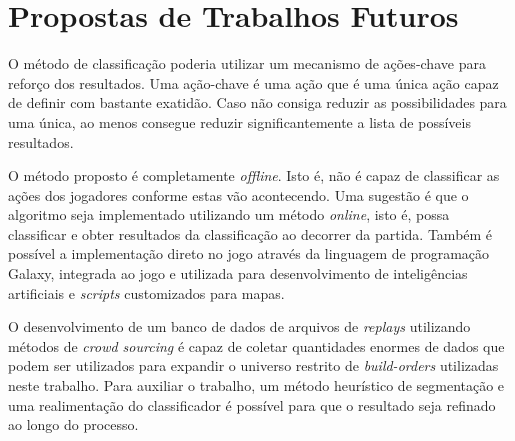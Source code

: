 	\chapter{Propostas de Trabalhos Futuros}
O método de classificação poderia utilizar um mecanismo de ações-chave para reforço dos resultados. Uma ação-chave é uma ação que é uma única ação capaz de definir com bastante exatidão. Caso não consiga reduzir as possibilidades para uma única, ao menos consegue reduzir significantemente a lista de possíveis resultados.

O método proposto é completamente \textit{offline}. Isto é, não é capaz de classificar as ações dos jogadores conforme estas vão acontecendo. Uma sugestão é que o algoritmo seja implementado utilizando um método \textit{online}, isto é, possa classificar e obter resultados da classificação ao decorrer da partida. Também é possível a implementação direto no jogo através da linguagem de programação Galaxy, integrada ao jogo e utilizada para desenvolvimento de inteligências artificiais e \textit{scripts} customizados para mapas.

O desenvolvimento de um banco de dados de arquivos de \textit{\glspl{replay}} utilizando métodos de \textit{crowd sourcing} é capaz de coletar quantidades enormes de dados que podem ser utilizados para expandir o universo restrito de \textit{\glspl{build-order}} utilizadas neste trabalho. Para auxiliar o trabalho, um método heurístico de segmentação e uma realimentação do classificador é possível para que o resultado seja refinado ao longo do processo.

	\postextual
	

\renewcommand{\glossaryname}{Glossário}



